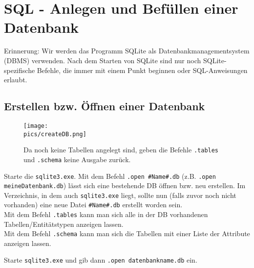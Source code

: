 \section[Anlegen/Befüllen einer DB]{SQL - Anlegen und Befüllen einer Datenbank}
Erinnerung: Wir werden das Programm SQLite als Datenbankmanagementsystem (DBMS) verwenden. Nach dem Starten von SQLite sind nur noch SQLite-spezifische Befehle, die immer mit einem Punkt beginnen oder SQL-Anweisungen erlaubt.

\subsection{Erstellen bzw. Öffnen einer Datenbank}
\begin{wrapfigure}{r}{6.91cm}
	\centering
	\texttt{[image: \\pics/createDB.png]}
	\caption*{Da noch keine Tabellen angelegt sind, geben die Befehle \lstinline!.tables! und \lstinline!.schema! keine Ausgabe zurück.}
\end{wrapfigure}
Starte die \texttt{sqlite3.exe}. Mit dem Befehl \lstinline!.open #Name#.db! (z.B. \lstinline!.open meineDatenbank.db!) lässt sich eine bestehende DB öffnen bzw. neu erstellen. Im Verzeichnis, in dem auch \texttt{sqlite3.exe} liegt, sollte nun (falls zuvor noch nicht vorhanden) eine neue Datei \texttt{\#Name\#.db} erstellt worden sein.\\
Mit dem Befehl \lstinline!.tables! kann man sich alle in der DB vorhandenen Tabellen/Entitätstypen anzeigen lassen.\\
Mit dem Befehl \lstinline!.schema! kann man sich die Tabellen mit einer Liste der Attribute anzeigen lassen.
\begin{tcolorbox}[title=Datenbank öffnen]
	Starte \texttt{sqlite3.exe} und gib dann \lstinline!.open datenbankname.db! ein.
\end{tcolorbox}

